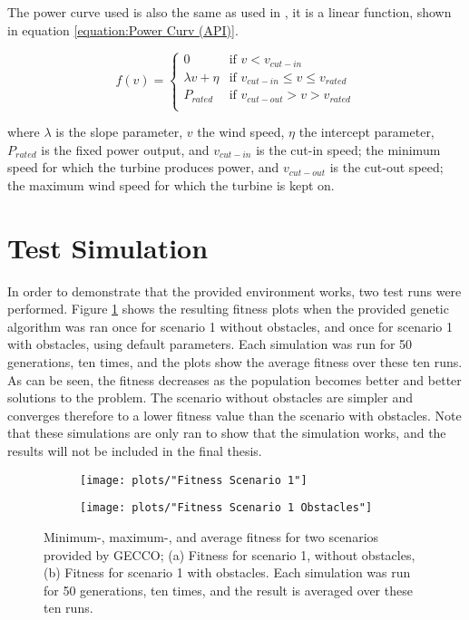 \noindent The power curve used is also the same as used in \citep{Kusiak}, it is a linear function, shown in equation \ref{equation:Power Curv (API)}.

\begin{equation}
 f(v) = 
  \begin{cases} 
   0                                  & \text{if }     v < v_{cut-in} \\
   \lambda v + \eta           & \text{if }     v_{cut-in} \leq v \leq v_{rated} \\
   P_{rated}                        & \text{if }     v_{cut-out} > v > v_{rated} \\
  \end{cases}
  \label{equation:Power Curv (API)}
\end{equation}

\noindent where $\lambda$ is the slope parameter, $v$ the wind speed, $\eta$ the intercept parameter, $P_{rated}$ is the fixed power output, and $v_{cut-in}$ is the cut-in speed; the minimum speed for which the turbine produces power, and $v_{cut-out}$ is the cut-out speed; the maximum wind speed for which the turbine is kept on. 


\section{Test Simulation}
In order to demonstrate that the provided environment works, two test runs were performed. Figure \ref{Test Plots} shows the resulting fitness plots when the provided genetic algorithm was ran once for scenario 1 without obstacles, and once for scenario 1 with obstacles, using default parameters. Each simulation was run for 50 generations, ten times, and the plots show the average fitness over these ten runs. As can be seen, the fitness decreases as the population becomes better and better solutions to the problem. The scenario without obstacles are simpler and converges therefore to a lower fitness value than the scenario with obstacles. Note that these simulations are only ran to show that the simulation works, and the results will not be included in the final thesis. 


\begin{figure}[h!]
    \centering
    \begin{subfigure}[b]{0.45\textwidth}
        \texttt{[image: plots/"Fitness Scenario 1"]}
        \caption{}
    \end{subfigure}
    \begin{subfigure}[b]{0.45\textwidth}
        \texttt{[image: plots/"Fitness Scenario 1 Obstacles"]}
        \caption{}
    \end{subfigure}
    \caption{Minimum-, maximum-, and average fitness for two scenarios provided by GECCO; (a) Fitness for scenario 1, without obstacles, (b) Fitness for scenario 1 with obstacles. Each simulation was run for 50 generations, ten times, and the result is averaged over these ten runs.}
    \label{Test Plots}
\end{figure}


